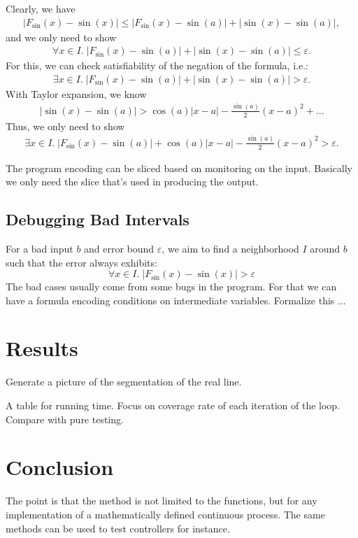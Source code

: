 \documentclass{acm_proc_article-sp}
\begin{document}
Clearly, we have
\begin{eqnarray}
|F_{\sin}(x)-\sin(x)|\leq |F_{\sin}(x)-\sin(a)|+|\sin(x)-\sin(a)|,
\end{eqnarray}
and we only need to show
\begin{eqnarray}
\forall x\in I.\;|F_{\sin}(x)-\sin(a)|+|\sin(x)-\sin(a)|\leq \varepsilon.
\end{eqnarray}
For this, we can check satisfiability of the negation of the formula, i.e.:
\begin{eqnarray}
\exists x\in I.\;|F_{\sin}(x)-\sin(a)|+|\sin(x)-\sin(a)|> \varepsilon.
\end{eqnarray}
With Taylor expansion, we know
\begin{eqnarray}
|\sin(x)-\sin(a)|>\cos(a)|x-a|-\frac{\sin(a)}{2}(x-a)^2 + ... %
\end{eqnarray}
Thus, we only need to show
\begin{eqnarray}
\exists x\in I.\;|F_{\sin}(x)-\sin(a)|+\cos(a)|x-a|-\frac{\sin(a)}{2}(x-a)^2> \varepsilon.
\end{eqnarray}

The program encoding can be sliced based on monitoring on the input. Basically we only need the slice that's used in producing the output. 

\subsection{Debugging Bad Intervals}

For a bad input $b$ and error bound $\varepsilon$, we aim to find a neighborhood $I$ around $b$ such that the error always exhibits:
$$\forall x\in I.\; |F_{\sin}(x)-\sin(x)|>\varepsilon$$
The bad cases usually come from some bugs in the program. For that we can have a formula encoding conditions on intermediate variables. Formalize this ...


\section{Results}

Generate a picture of the segmentation of the real line. 

A table for running time. Focus on coverage rate of each iteration of the loop. Compare with pure testing. 


\section{Conclusion}

The point is that the method is not limited to the functions, but for any implementation of a mathematically defined continuous process. The same methods can be used to test controllers for instance. 
\end{document}
